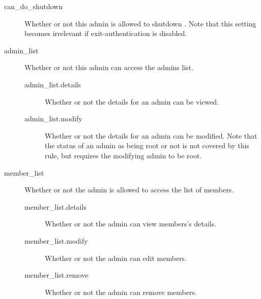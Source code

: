     \begin{description}
        \item [can\_do\_shutdown] Whether or not this admin is allowed to shutdown \srl. Note that this setting becomes irrelevant if exit-authentication is disabled.
        
        \item [admin\_list] Whether or not this admin can access the admins list.
        \begin{description}
            \item [admin\_list.details] Whether or not the details for an admin
                    can be viewed.
            \item [admin\_list.modify] Whether or not the details for an admin
                    can be modified. Note that the status of an admin as being
                    root or not is not covered by this rule, but requires the
                    modifying admin to be root.
        \end{description}
        
        \item [member\_list] Whether or not the admin is allowed to access the list of members.
        \begin{description}
            \item [member\_list.details] Whether or not the admin can view members's details.
            \item [member\_list.modify] Whether or not the admin can edit members.
            \item [member\_list.remove] Whether or not the admin can remove members.
        \end{description}
    \end{description}